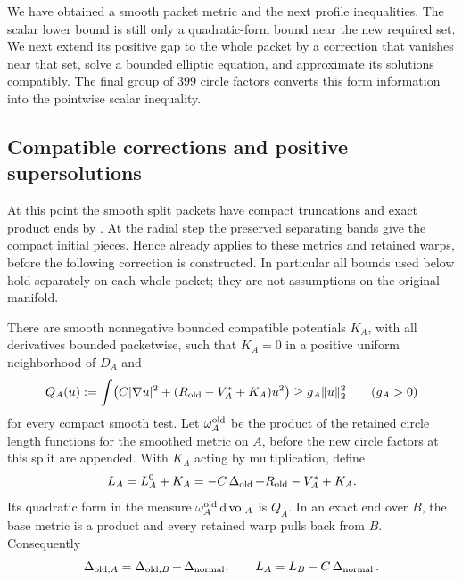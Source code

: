 We have obtained a smooth packet metric and the next profile
inequalities. The scalar lower bound is still only a quadratic-form
bound near the new required set. We next extend its positive gap to
the whole packet by a correction that vanishes near that set, solve a
bounded elliptic equation, and approximate its solutions compatibly.
The final group of $399$ circle factors converts this form information
into the pointwise scalar inequality.

\subsection{Compatible corrections and positive supersolutions}

At this point the smooth split packets have compact truncations and
exact product ends by .  At the radial step the
preserved separating bands give the compact initial pieces.  Hence
 already applies to these metrics and retained
warps, before the following correction is constructed.  In particular
all bounds used below hold separately on each whole packet; they are
not assumptions on the original manifold.

\begin{lemma}\label{regular:correction}
There are smooth nonnegative bounded compatible potentials $K_A$,
with all derivatives bounded packetwise, such that $K_A=0$ in a
positive uniform neighborhood of $D_A$ and
\begin{equation}\label{regular:global-gap}
 Q_A(u):=\int\bigl(C|\nabla u|^2+
       (R_{\rm old}-V_A^*+K_A)u^2\bigr)
 \ge g_A\|u\|_2^2\qquad(g_A>0)
\end{equation}
for every compact smooth test.
Let $\omega_A^{\rm old}$ be the product of the retained circle length
functions for the smoothed metric on $A$, before the new circle
factors at this split are appended.  With $K_A$ acting by
multiplication, define
\[
 L_A=L_A^0+K_A
     =-C\operatorname{\Delta}_{\rm old}+R_{\rm old}-V_A^*+K_A.
\]
Its quadratic form in the measure
$\omega_A^{\rm old}\,\mathrm d\operatorname{vol}_A$ is $Q_A$.
In an exact end over $B$, the base metric is a product and every
retained warp pulls back from $B$.  Consequently
\[
 \operatorname{\Delta}_{{\rm old},A}=\operatorname{\Delta}_{{\rm old},B}+\operatorname{\Delta}_{\rm normal},
 \qquad L_A=L_B-C\operatorname{\Delta}_{\rm normal}.
\]
\end{lemma}

